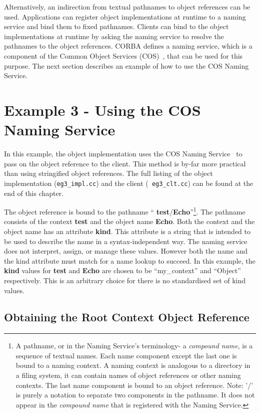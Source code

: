 \documentclass[11pt,twoside,onecolumn]{book}
\begin{document}
Alternatively, an indirection from textual pathnames to object references
can be used. Applications can register object implementations at runtime to
a naming service and bind them to fixed pathnames. Clients can bind to the
object implementations at runtime by asking the naming service to resolve
the pathnames to the object references. CORBA defines a naming service,
which is a component of the Common Object Services
(COS)~\cite{corbaservices}, that can be used for this purpose. The next
section describes an example of how to use the COS Naming Service.

\section{Example 3 - Using the COS Naming Service}

In this example, the object implementation uses the COS Naming
Service~\cite{corbaservices} to
pass on the object reference to the client.  This method is by-far more
practical than using stringified object references. The full listing of
the object implementation ({\tt eg3\_impl.cc}) and the client ({\tt
eg3\_clt.cc}) can be found at the end of this chapter.

The object reference is bound to the pathname ``{\bf
test}/{\bf Echo}''\footnote{A pathname, or in the Naming Service's
terminology- a {\it compound name}, is a sequence of textual names. Each
name component except the last one is bound to a naming context. A naming
context is analogous to a directory in a filing system, it can contain
names of object references or other naming contexts. The last name
component is bound to an object reference. Note: '/' is purely a notation
to separate two components in the pathname. It does not appear in the {\it
compound name} that is registered with the Naming Service.}. The pathname
consists of the context {\bf test} and the object name {\bf Echo}. Both the
context and the object name has an attribute {\bf kind}. This attribute is
a string that is intended to be used to describe the name in a
syntax-independent way. The naming service does not interpret, assign, or
manage these values. However both the name and the kind attribute must
match for a name lookup to succeed. In this example, the {\bf kind} values
for {\bf test} and {\bf Echo} are chosen to be ``my\_context'' and
``Object'' respectively. This is an arbitrary choice for there is no
standardised set of kind values.

\subsection{Obtaining the Root Context Object Reference}
\label{resolveinit}
\end{document}
